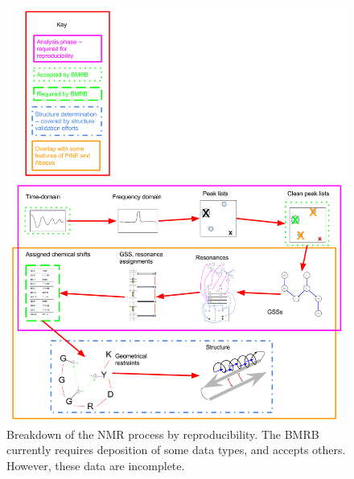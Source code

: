 \begin{figure}
  \includegraphics[scale=0.3]{figures/nmr_process}
  \caption[Breakdown of the NMR process by reproducibility.]
          {Breakdown of the NMR process by reproducibility.  The BMRB currently
           requires deposition of some data types, and accepts others.  However,
           these data are incomplete.}
  \label{nmr_process}
\end{figure}

